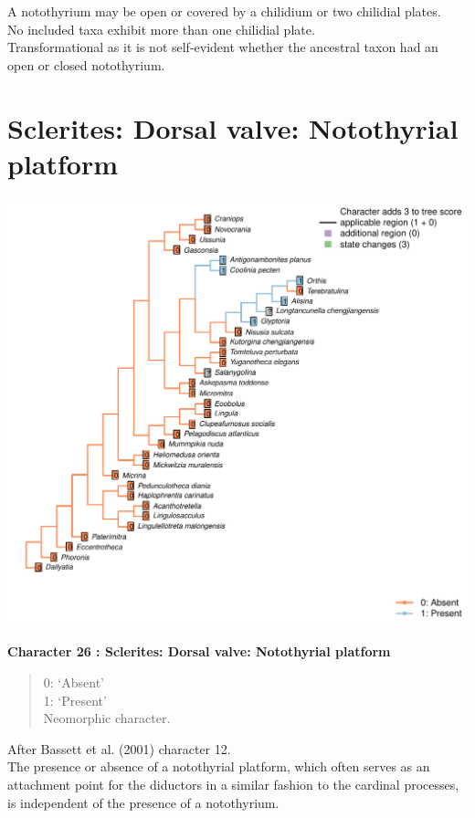 \documentclass[]{book}
\theoremstyle{definition}
\theoremstyle{definition}
\theoremstyle{definition}
\theoremstyle{remark}
\begin{document}
A notothyrium may be open or covered by a chilidium or two chilidial
plates.\\
No included taxa exhibit more than one chilidial plate.\\
Transformational as it is not self-evident whether the ancestral taxon
had an open or closed notothyrium.

\hypertarget{sclerites-dorsal-valve-notothyrial-platform}{%
\section*{Sclerites: Dorsal valve: Notothyrial
platform}\label{sclerites-dorsal-valve-notothyrial-platform}}

\includegraphics{Brachiopod_phylogeny_files/figure-latex/unnamed-chunk-5-26.pdf}

\textbf{Character 26 : Sclerites: Dorsal valve: Notothyrial platform }

\begin{quote}
0: `Absent'\\
1: `Present'\\
Neomorphic character.
\end{quote}

After Bassett et al. (2001) character 12.\\
The presence or absence of a notothyrial platform, which often serves as
an attachment point for the diductors in a similar fashion to the
cardinal processes, is independent of the presence of a notothyrium.
\end{document}
